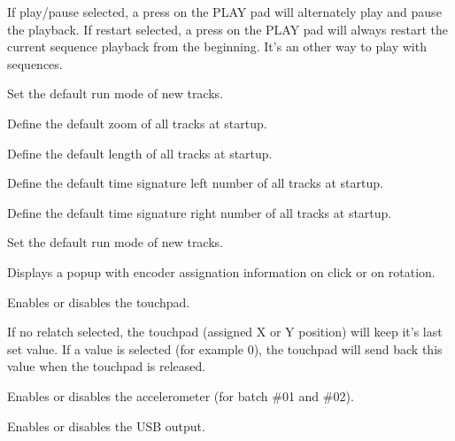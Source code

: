   

If play/pause selected, a press on the PLAY pad will alternately play and pause the playback. If restart selected, a press on the PLAY pad will always restart the current sequence playback from the beginning. It's an other way to play with sequences.

   

Set the default run mode of new tracks.

     

Define the default zoom of all tracks at startup.

  \btn{\ldots} 

Define the default length of all tracks at startup.

  \btn{\ldots} 

Define the default time signature left number of all tracks at startup.

  \btn{\ldots} 

Define the default time signature right number of all tracks at startup.

    \btn{\ldots} 

Set the default run mode of new tracks.

  

Displays a popup with encoder assignation information on click or on rotation.

  

Enables or disables the touchpad.

   \btn{\ldots} 

If no relatch selected, the touchpad (assigned X or Y position) will keep it's last set value. If a value is selected (for example 0), the touchpad will send back this value when the touchpad is released.

  

Enables or disables the accelerometer (for batch \#01 and \#02).

  

Enables or disables the USB output.

